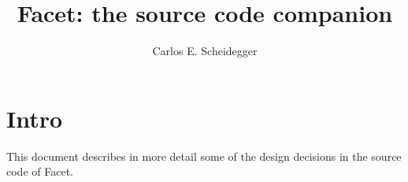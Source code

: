 \documentclass{book}
\author{Carlos E. Scheidegger}
\title{Facet: the source code companion}
\begin{document}
\maketitle
\chapter{Intro}
This document describes in more detail some of the design decisions in
the source code of Facet.


\end{document}
